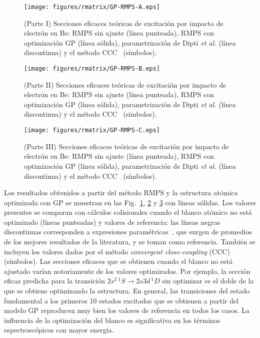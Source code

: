 \begin{figure}
\centering
\texttt{[image: figures/rmatrix/GP-RMPS-A.eps]} 
\caption[Secciones eficaces de excitación de Be (Parte I).]
{(Parte I) Secciones eficaces teóricas de excitación por impacto de 
electrón en Be: RMPS sin ajuste (línea punteada), RMPS con optimización 
GP (línea sólida), parametrización de Dipti \textit{et al.}
\cite{Dipti:19} (línea discontinua) y el método CCC~\cite{Fursa:97} 
(símbolos).}
\label{fig:crossBe-partI}
\end{figure}

\begin{figure}
\centering
\texttt{[image: figures/rmatrix/GP-RMPS-B.eps]} 
\caption[Secciones eficaces de excitación de Be (Parte II).]
{(Parte II) Secciones eficaces teóricas de excitación por impacto de 
electrón en Be: RMPS sin ajuste (línea punteada), RMPS con optimización 
GP (línea sólida), parametrización de Dipti \textit{et al.}
\cite{Dipti:19} (línea discontinua) y el método CCC~\cite{Fursa:97}
(símbolos).}
\label{fig:crossBe-partII}
\end{figure}

\begin{figure}[t]
\centering
\texttt{[image: figures/rmatrix/GP-RMPS-C.eps]} 
\caption[Secciones eficaces de excitación de Be (Parte II).]
{(Parte III) Secciones eficaces teóricas de excitación por impacto de 
electrón en Be: RMPS sin ajuste (línea punteada), RMPS con optimización 
GP (línea sólida), parametrización de Dipti \textit{et al.}
\cite{Dipti:19} (línea discontinua) y el método CCC~\cite{Fursa:97}
(símbolos).}
\label{fig:crossBe-partIII}
\end{figure}

Los resultados obtenidos a partir del método RMPS y la estructura 
atómica optimizada con GP se muestran en las 
Fig.~\ref{fig:crossBe-partI}, \ref{fig:crossBe-partII} y 
\ref{fig:crossBe-partIII} con líneas sólidas. Los valores presentes se 
comparan con cálculos colisionales cuando el blanco atómico no está 
optimizado (líneas punteadas) y valores de referencia: las líneas negras 
discontinuas corresponden a expresiones paramétricas~\cite{Dipti:19}, que 
surgen de promedios de los mejores resultados de la literatura, y se 
toman como referencia. También se incluyen los valores dados por el 
método \textit{convergent close-coupling} (CCC)~\cite{Fursa:97} (símbolos).
Las secciones eficaces que se obtienen cuando el blanco no está ajustado 
varían notoriamente de los valores optimizados. Por ejemplo, la sección 
eficaz predicha para la transición $2s^2\,^1S\rightarrow 2s3d\,^1D$ sin 
optimizar es el doble de la que se obtiene optimizando la estructura. 
En general, las transiciones del estado fundamental a los primeros 10 
estados excitados
que se obtienen a partir del modelo GP reproducen muy bien los valores 
de referencia en todos los casos. La influencia de la optimización del 
blanco es significativa en los términos espectroscópicos con mayor 
energía.


